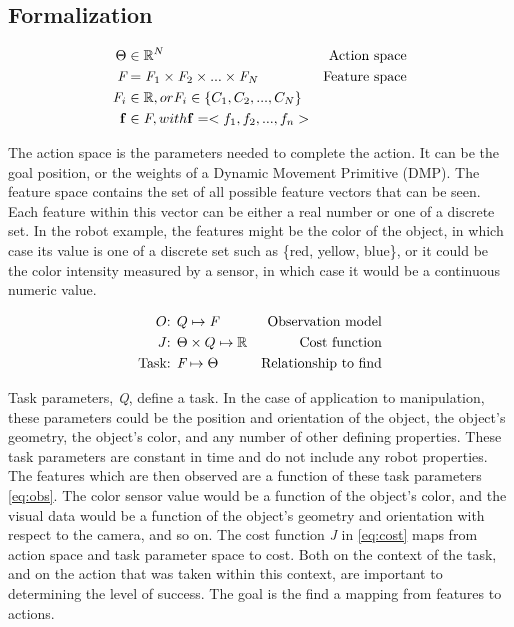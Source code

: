 \documentclass[12pt]{article}
\newcommand{\actsp}{\Theta}
\newcommand{\feat}{f}
\newcommand{\featsp}{\emph{F}}
\newcommand{\costf}{J}
\newcommand{\obsm}{O}
\newcommand{\taskpsp}{Q}
\newcommand{\featv}{\mathbf{f}}
\begin{document}
\subsection{Formalization}

\begin{align}
\actsp &\in \mathbb{R}^N & \mbox{Action space}\\
\featsp &= \featsp_1 \times \featsp_2 \times ... \times \featsp_N & \mbox{Feature space}\\
\featsp_i &\in \mathbb{R}, or \featsp_i \in \{C_1,C_2,...,C_N\}&\notag\\
\featv &\in \featsp, with \featv = <\feat_1,\feat_2,...,\feat_n>&
\end{align}

The action space is the parameters needed to complete the action. It can be the goal position, or the weights of a Dynamic Movement Primitive (DMP). The feature space contains the set of all possible feature vectors that can be seen. Each feature within this vector can be either a real number or one of a discrete set. In the robot example, the features might be the color of the object, in which case its value is one of a discrete set such as \{red, yellow, blue\}, or it could be the color intensity measured by a sensor, in which case it would be a continuous numeric value.

\begin{align}
\obsm\mbox{: } &\label{eq:obs}\taskpsp \mapsto \featsp& \mbox{Observation model}\\
\costf\mbox{: } &\label{eq:cost} \actsp \times \taskpsp \mapsto \mathbb{R}&\mbox{Cost function}\\
\mbox{Task: } &\featsp \mapsto \actsp& \mbox{Relationship to find}
\end{align}

 Task parameters, \emph{\taskpsp}, define a task. In the case of application to manipulation, these parameters could be the position and orientation of the object, the object's geometry, the object's color, and any number of other defining properties. These task parameters are constant in time and do not include any robot properties. The features which are then observed are a function of these task parameters \eqref{eq:obs}. The color sensor value would be a function of the object's color, and the visual data would be a function of the object's geometry and orientation with respect to the camera, and so on. The cost function \emph{J} in \eqref{eq:cost} maps from action space and task parameter space to cost. Both on the context of the task, and on the action that was taken within this context, are important to determining the level of success. The goal is the find a mapping from features to actions.
\end{document}
